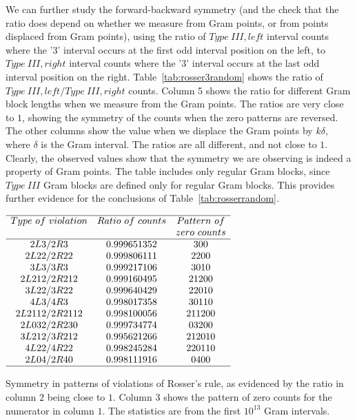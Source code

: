 \documentclass[twoside]{article}
\theoremstyle{definition}
\begin{document}
We can further study the forward-backward symmetry (and the check that the ratio does depend on whether we measure from Gram points, or from points displaced from Gram points), using the ratio of  $Type~III,left$ interval counts where the '3' interval occurs at the first odd interval position on the left, to  $Type~III,right$ interval counts where the '3' interval occurs at the last odd interval position on the right. 
Table~\ref{tab:rosser3random} shows the ratio of $Type~III,left/Type~III,right$ counts.  Column 5 shows the ratio for different Gram block lengths when we measure from the Gram points. The ratios are very close to  $1$, showing the symmetry of the counts when the zero patterns are reversed. The other columns show the value  when we displace the Gram points by $k\delta$, where $\delta$ is the Gram interval.  The ratios are all different, and not close to $1$. Clearly, the observed values show that the symmetry we are observing is indeed a property of Gram points. The table includes only regular Gram blocks, since $Type~III$ Gram blocks are defined only for regular Gram blocks. This provides further evidence for the conclusions of Table~\ref{tab:rosserrandom}.
  
\begin{table}
\centering \(\begin{array}{ccc}
\hline
Type~of~violation &Ratio~of~counts&Pattern~of\\
&&zero~counts\\
\hline
2L3/2R3 &0.999651352&300\\
2L22/2R22 &0.999806111&2200\\
3L3/3R3 &0.999217106&3010\\
2L212/2R212 &0.999160495&21200\\
3L22/3R22 &0.999640429&22010\\
4L3/4R3 &0.998017358&30110\\
2L2112/2R2112 &0.998100056&211200\\
2L032/2R230 &0.999734774&03200\\
3L212/3R212 &0.995621266&212010\\
4L22/4R22 &0.998245284&220110\\
2L04/2R40 &0.998111916&0400\\
\hline
\end{array}\)
\caption{Symmetry in patterns of violations of Rosser's rule, as evidenced by the ratio in column $2$ being close to $1$.  
Column $3$ shows the pattern of zero counts for the numerator in column $1$. The statistics are from the first $10^{13}$ Gram intervals.} 
\label{tab:vrr}
\end{table}
\end{document}
